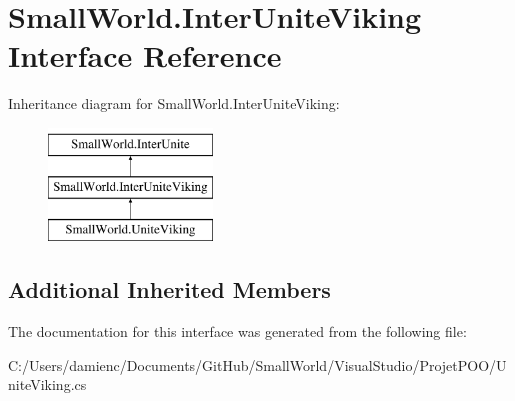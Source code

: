 \hypertarget{interface_small_world_1_1_inter_unite_viking}{\section{Small\-World.\-Inter\-Unite\-Viking Interface Reference}
\label{interface_small_world_1_1_inter_unite_viking}
}
Inheritance diagram for Small\-World.\-Inter\-Unite\-Viking\-:\begin{figure}[H]
\begin{center}
\leavevmode
\includegraphics[height=3.000000cm]{interface_small_world_1_1_inter_unite_viking}
\end{center}
\end{figure}
\subsection*{Additional Inherited Members}


The documentation for this interface was generated from the following file\-:\begin{DoxyCompactItemize}
\item 
C\-:/\-Users/damienc/\-Documents/\-Git\-Hub/\-Small\-World/\-Visual\-Studio/\-Projet\-P\-O\-O/Unite\-Viking.\-cs\end{DoxyCompactItemize}
